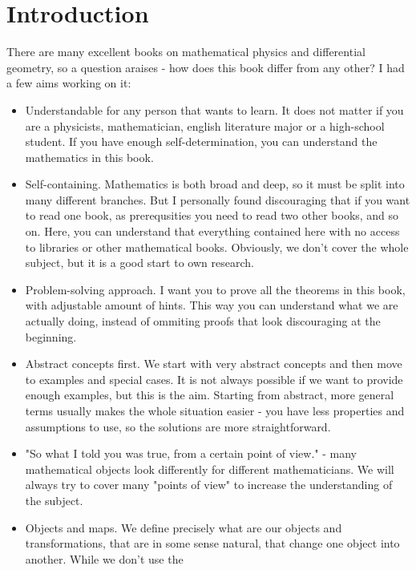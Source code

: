 %
%
%

\chapter{Introduction}
\label{intro} %

There are many excellent books on mathematical physics and differential geometry, so a question araises - how does
this book differ from any other? I had a few aims working on it:
\begin{itemize}
  \item Understandable for any person that wants to learn. It does not matter
    if you are a physicists, mathematician, english literature major or a high-school student. If you have
    enough self-determination, you can understand the mathematics in this book.
  \item Self-containing. Mathematics is both broad and deep, so it must be split into many
    different  branches. But I personally found discouraging that if you want to read one book, as prerequsities you need
    to read two other books, and so on. Here, you can understand that everything contained here with no access to libraries or
    other mathematical books. Obviously, we don't cover the whole subject, but it is a good start to own research.
  \item Problem-solving approach. I want you to prove all the theorems in this book, with adjustable amount of hints.
      This way you can understand what we are actually doing, instead of ommiting proofs that look discouraging at the beginning.
  \item Abstract concepts first. We start with very abstract concepts and then move to examples and special cases. It is not always possible if we want to provide
    enough examples, but this is the aim. Starting from abstract, more general terms usually makes the whole situation easier - you have less properties and assumptions to use,
    so the solutions are more straightforward.
  \item "So what I told you was true, from a certain point of view." - many mathematical objects look differently for different mathematicians. We will always try to cover many
    "points of view" to increase the understanding of the subject.
  \item Objects and maps. We define precisely what are our objects and transformations, that are in some sense natural, that change one object into another. While we don't use the

\end{itemize}

